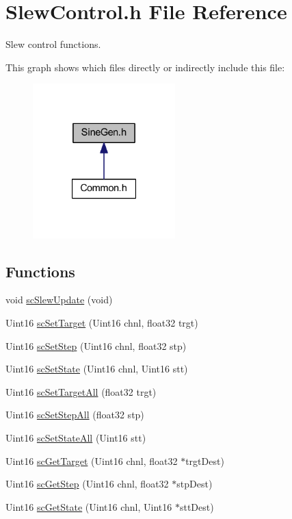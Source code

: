 \hypertarget{a00034}{\section{Slew\-Control.\-h File Reference}
\label{a00034}
}


Slew control functions.  


This graph shows which files directly or indirectly include this file\-:
\nopagebreak
\begin{figure}[H]
\begin{center}
\leavevmode
\includegraphics[width=156pt]{a00056}
\end{center}
\end{figure}
\subsection*{Functions}
\begin{DoxyCompactItemize}
\item 
void \hyperlink{a00034_a8f8f2b1ef59b7fa90122e5609e24cd06}{sc\-Slew\-Update} (void)
\item 
Uint16 \hyperlink{a00034_acd4f1d77c353f333438ae688a9bcc8fe}{sc\-Set\-Target} (Uint16 chnl, float32 trgt)
\item 
Uint16 \hyperlink{a00034_a91e197a77f8f6c05dc478431164114a4}{sc\-Set\-Step} (Uint16 chnl, float32 stp)
\item 
Uint16 \hyperlink{a00034_a92578a062af02eb967ca2dfbd68b00cf}{sc\-Set\-State} (Uint16 chnl, Uint16 stt)
\item 
Uint16 \hyperlink{a00034_a1e7d07e1a6d9b1e40b1b39d97df638b9}{sc\-Set\-Target\-All} (float32 trgt)
\item 
Uint16 \hyperlink{a00034_a2dbe145695a65570ebc1ff5588e08a18}{sc\-Set\-Step\-All} (float32 stp)
\item 
Uint16 \hyperlink{a00034_af4b016a1a10639dfeca7af4f750d8c75}{sc\-Set\-State\-All} (Uint16 stt)
\item 
Uint16 \hyperlink{a00034_ab83b8f320a4bf9e8ea1a251fec458032}{sc\-Get\-Target} (Uint16 chnl, float32 $\ast$trgt\-Dest)
\item 
Uint16 \hyperlink{a00034_adac64f58de9a029d849e0df2962bad16}{sc\-Get\-Step} (Uint16 chnl, float32 $\ast$stp\-Dest)
\item 
Uint16 \hyperlink{a00034_a77a235d70df3aff6a742ff375bd45119}{sc\-Get\-State} (Uint16 chnl, Uint16 $\ast$stt\-Dest)
\end{DoxyCompactItemize}


